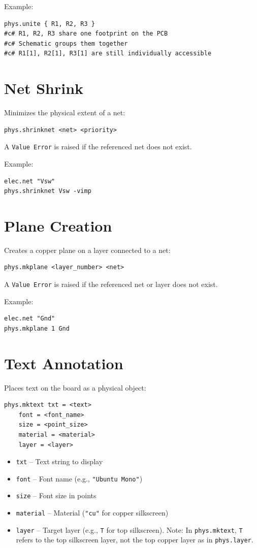 Example:
\begin{verbatim}
phys.unite { R1, R2, R3 }
#c# R1, R2, R3 share one footprint on the PCB
#c# Schematic groups them together
#c# R1[1], R2[1], R3[1] are still individually accessible
\end{verbatim}

\section{Net Shrink}
Minimizes the physical extent of a net:
\begin{verbatim}
phys.shrinknet <net> <priority>
\end{verbatim}

A \texttt{Value Error} is raised if the referenced net does not exist.

Example:
\begin{verbatim}
elec.net "Vsw"
phys.shrinknet Vsw -vimp
\end{verbatim}

\section{Plane Creation}
Creates a copper plane on a layer connected to a net:
\begin{verbatim}
phys.mkplane <layer_number> <net>
\end{verbatim}

A \texttt{Value Error} is raised if the referenced net or layer does not exist.

Example:
\begin{verbatim}
elec.net "Gnd"
phys.mkplane 1 Gnd
\end{verbatim}

\section{Text Annotation}
Places text on the board as a physical object:
\begin{verbatim}
phys.mktext txt = <text> 
    font = <font_name> 
    size = <point_size> 
    material = <material> 
    layer = <layer>
\end{verbatim}
\begin{itemize}
\item \texttt{txt} -- Text string to display
\item \texttt{font} -- Font name (e.g., \texttt{"Ubuntu Mono"})
\item \texttt{size} -- Font size in points
\item \texttt{material} -- Material (\texttt{"cu"} for copper silkscreen)
\item \texttt{layer} -- Target layer (e.g., \texttt{T} for top silkscreen). Note: In \texttt{phys.mktext}, \texttt{T} refers to the top silkscreen layer, not the top copper layer as in \texttt{phys.layer}.
\end{itemize}

